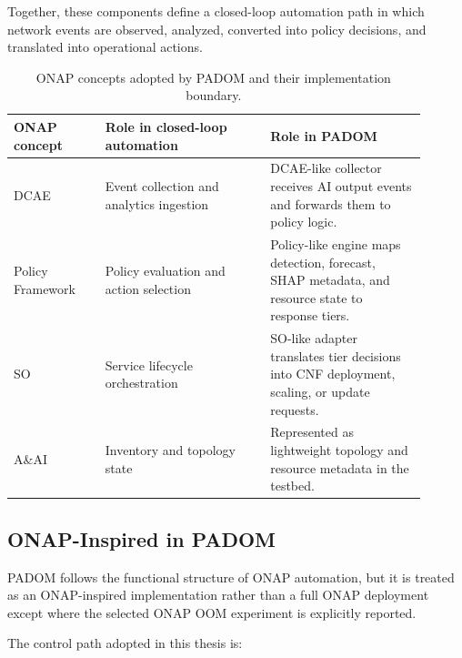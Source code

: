 \documentclass[12pt, a4paper, reqno, oneside]{book}
\newcommand{\padonap}{\textsc{PADOM}}
\begin{document}
Together, these components define a closed-loop automation path in which
network events are observed, analyzed, converted into policy decisions, and
translated into operational actions.

\begin{table}[htbp]
\centering
\small
\caption{ONAP concepts adopted by \padonap{} and their implementation boundary.}
\label{tab:onap-concepts-bg}
\begin{tabular}{@{}p{0.20\linewidth}p{0.36\linewidth}p{0.34\linewidth}@{}}
\toprule
ONAP concept & Role in closed-loop automation & Role in \padonap{} \\
\midrule
DCAE & Event collection and analytics ingestion &
DCAE-like collector receives AI output events and forwards them to policy
logic. \\
Policy Framework & Policy evaluation and action selection &
Policy-like engine maps detection, forecast, SHAP metadata, and resource state
to response tiers. \\
SO & Service lifecycle orchestration &
SO-like adapter translates tier decisions into CNF deployment, scaling, or
update requests. \\
A\&AI & Inventory and topology state &
Represented as lightweight topology and resource metadata in the testbed. \\
\bottomrule
\end{tabular}
\end{table}

\subsection{ONAP-Inspired in \padonap{}}
\label{subsec:onap-inspired-bg}

\padonap{} follows the functional structure of ONAP automation,
but it is treated as an ONAP-inspired implementation rather than a full
ONAP deployment except where the selected ONAP OOM experiment is explicitly
reported.

The control path adopted in this thesis is:
\end{document}
